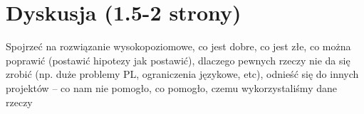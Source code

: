 
\chapter{Dyskusja (1.5-2 strony)}

Spojrzeć na rozwiązanie wysokopoziomowe, co jest dobre, co jest złe, co można poprawić (postawić hipotezy jak postawić), dlaczego pewnych rzeczy nie da się zrobić (np. duże problemy PL, ograniczenia językowe, etc), odnieść się do innych projektów – co nam nie pomogło, co pomogło, czemu wykorzystaliśmy dane rzeczy



